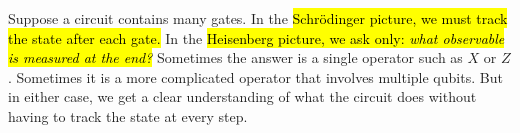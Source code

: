 \noindent
Suppose a circuit contains many gates. In the \hl{Schrödinger picture, we must track the state after each gate.} In the \hl{Heisenberg picture, we ask only: \emph{what observable is measured at the end?}} Sometimes the answer is a single operator such as $X$ or $Z$. Sometimes it is a more complicated operator that involves multiple qubits. But in either case, we get a clear understanding of what the circuit does without having to track the state at every step.